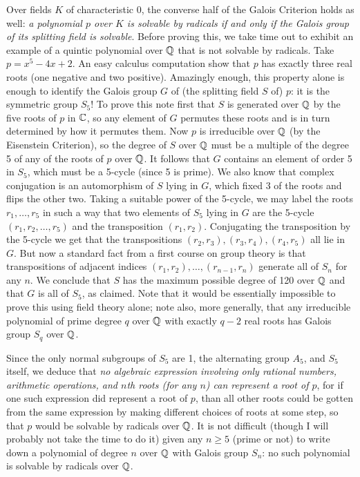 \documentclass[10pt]{article}
\begin{document}
Over fields $K$ of characteristic 0, the converse half of the Galois
Criterion holds as well: {\sl a polynomial $p$ over $K$ is solvable by
  radicals if and only if the Galois group of its splitting field is
  solvable}. Before proving this, we take time out to exhibit an example
of a quintic polynomial over $\Bbb Q$ that is not solvable by radicals.
Take $p= x^5 - 4x + 2$. An easy calculus computation show that $p$ has
exactly three real roots (one negative and two positive). Amazingly
enough, this property alone is enough to identify the Galois group $G$
of (the splitting field $S$ of) $p$: it is the symmetric group $S_5$! To
prove this note first that $S$ is generated over $\Bbb Q$ by the five
roots of $p$ in $\Bbb C$, so any element of $G$ permutes these roots and
is in turn determined by how it permutes them. Now $p$ is irreducible
over $\Bbb Q$ (by the Eisenstein Criterion), so the degree of $S$ over
$\Bbb Q$ must be a multiple of the degree 5 of any of the roots of $p$
over $\Bbb Q$. It follows that $G$ contains an element of order 5 in
$S_5$, which must be a 5-cycle (since 5 is prime). We also know that
complex conjugation is an automorphism of $S$ lying in $G$, which fixed
3 of the roots and flips the other two. Taking a suitable power of the
5-cycle, we may label the roots $r_1,\ldots,r_5$ in such a way that two
elements of $S_5$ lying in $G$ are the 5-cycle $(r_1, r_2,\ldots,r_5)$
and the transposition $(r_1,r_2)$. Conjugating the transposition by the
5-cycle we get that the transpositions $(r_2,r_3),(r_3,r_4),(r_4,r_5)$
all lie in $G$. But now a standard fact from a first course on group
theory is that transpositions of adjacent indices
$(r_1,r_2),\ldots,(r_{n-1},r_n)$ generate all of $S_n$ for any $n$. We
conclude that $S$ has the maximum possible degree of 120 over $\Bbb Q$
and that $G$ is all of $S_5$, as claimed. Note that it would be
essentially impossible to prove this using field theory alone; note
also, more generally, that any irreducible polynomial of prime degree
$q$ over $\Bbb Q$ with exactly $q-2$ real roots has Galois group $S_q$
over $\Bbb Q$.

Since the only normal subgroups of $S_5$ are 1, the alternating group
$A_5$, and $S_5$ itself, we deduce that {\sl no algebraic expression
  involving only rational numbers, arithmetic operations, and $n$th
  roots (for any $n$) can represent a root of $p$}, for if one such
expression did represent a root of $p$, than all other roots could be
gotten from the same expression by making different choices of roots at
some step, so that $p$ would be solvable by radicals over $\Bbb Q$. It
is not difficult (though I will probably not take the time to do it)
given any $n\ge5$ (prime or not) to write down a polynomial of degree
$n$ over $\Bbb Q$ with Galois group $S_n$: no such polynomial is
solvable by radicals over $\Bbb Q$.
\end{document}

